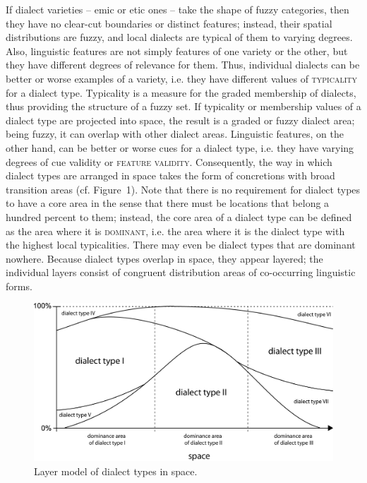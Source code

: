\documentclass[output=paper]{LSP/langsci}
\begin{document}
If dialect varieties – emic or etic ones – take the shape of fuzzy categories, then they have no clear-cut boundaries or distinct features; instead, their spatial distributions are fuzzy, and local dialects are typical of them to varying degrees. Also, linguistic features are not simply features of one variety or the other, but they have different degrees of relevance for them. Thus, individual dialects can be better or worse examples of a variety, i.e. they have different values of \textsc{typicality} for a dialect type. Typicality is a measure for the graded membership of dialects, thus providing the structure of a fuzzy set. If typicality or membership values of a dialect type are projected into space, the result is a graded or fuzzy dialect area; being fuzzy, it can overlap with other dialect areas. Linguistic features, on the other hand, can be better or worse cues for a dialect type, i.e. they have varying degrees of cue validity or \textsc{feature validity}. Consequently, the way in which dialect types are arranged in space takes the form of concretions with broad transition areas (cf. Figure~1). Note that there is no requirement for dialect types to have a core area in the sense that there must be locations that belong a hundred percent to them; instead, the core area of a dialect type can be defined as the area where it is \textsc{dominant}, i.e. the area where it is the dialect type with the highest local typicalities. There may even be dialect types that are dominant nowhere. Because dialect types overlap in space, they appear layered; the individual layers consist of congruent distribution areas of co-occurring linguistic forms.

\begin{figure}
\includegraphics[width=\textwidth]{illustrations/pickl_fig1}
\caption{Layer model of dialect types in space.}
\label{fig:1}
\end{figure}
\end{document}
